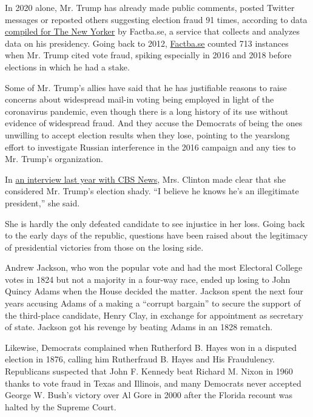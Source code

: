 In 2020 alone, Mr. Trump has already made public comments, posted
Twitter messages or reposted others suggesting election fraud 91 times,
according to data
\href{https://www.newyorker.com/news/letter-from-trumps-washington/trump-is-the-election-crisis-he-is-warning-about}{compiled
for The New Yorker} by Factba.se, a service that collects and analyzes
data on his presidency. Going back to 2012,
\href{https://factba.se/}{Factba.se} counted 713 instances when Mr.
Trump cited vote fraud, spiking especially in 2016 and 2018 before
elections in which he had a stake.

Some of Mr. Trump's allies have said that he has justifiable reasons to
raise concerns about widespread mail-in voting being employed in light
of the coronavirus pandemic, even though there is a long history of its
use without evidence of widespread fraud. And they accuse the Democrats
of being the ones unwilling to accept election results when they lose,
pointing to the yearslong effort to investigate Russian interference in
the 2016 campaign and any ties to Mr. Trump's organization.

In
\href{https://www.cbsnews.com/video/hillary-clinton-trump-knows-hes-an-illegitimate-president/\#x}{an
interview last year with CBS News}, Mrs. Clinton made clear that she
considered Mr. Trump's election shady. ``I believe he knows he's an
illegitimate president,'' she said.

She is hardly the only defeated candidate to see injustice in her loss.
Going back to the early days of the republic, questions have been raised
about the legitimacy of presidential victories from those on the losing
side.

Andrew Jackson, who won the popular vote and had the most Electoral
College votes in 1824 but not a majority in a four-way race, ended up
losing to John Quincy Adams when the House decided the matter. Jackson
spent the next four years accusing Adams of a making a ``corrupt
bargain'' to secure the support of the third-place candidate, Henry
Clay, in exchange for appointment as secretary of state. Jackson got his
revenge by beating Adams in an 1828 rematch.

Likewise, Democrats complained when Rutherford B. Hayes won in a
disputed election in 1876, calling him Rutherfraud B. Hayes and His
Fraudulency. Republicans suspected that John F. Kennedy beat Richard M.
Nixon in 1960 thanks to vote fraud in Texas and Illinois, and many
Democrats never accepted George W. Bush's victory over Al Gore in 2000
after the Florida recount was halted by the Supreme Court.

